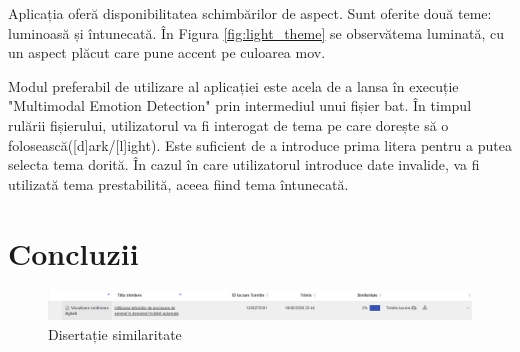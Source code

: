 \documentclass[a4paper, 12pt]{report}
\begin{document}
	Aplicația oferă disponibilitatea schimbărilor de aspect. Sunt oferite două teme: luminoasă și întunecată. În Figura \ref{fig:light_theme} se observătema luminată, cu un aspect plăcut care pune accent pe culoarea mov.

	Modul preferabil de utilizare al aplicației este acela de a lansa în execuție "Multimodal Emotion Detection" prin intermediul unui fișier bat. În timpul rulării fișierului, utilizatorul va fi interogat de tema pe care dorește să o folosească([d]ark/[l]ight). Este suficient de a introduce prima litera pentru a putea selecta tema dorită. În cazul în care utilizatorul introduce date invalide, va fi utilizată tema prestabilită, aceea fiind tema întunecată.

	\clearpage
	\section{Concluzii}
	
	\clearpage
    \printbibliography
    \clearpage
	\begin{figure}[H]
		\begin{center}
			\includegraphics[scale=0.4]{images/plagiat.PNG}
		\end{center}
		\caption{Disertație similaritate}
		\label{fig:sim}
	\end{figure} 	
\end{document}
